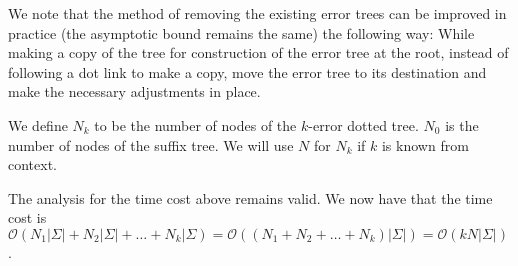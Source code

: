We note that the method of removing the existing error trees can be improved in practice (the asymptotic bound remains the same) the following way: While making a copy of the tree for construction of the error tree at the root, instead of following a dot link to make a copy, move the error tree to its destination and make the necessary adjustments in place.%

\begin{definition}
We define $N_k$ to be the number of nodes of the $k$-error dotted tree. $N_0$ is the number of nodes of the suffix tree. We will use $N$ for $N_k$ if $k$ is known from context.
\end{definition}

The analysis for the time cost above remains valid. We now have that the time cost is $\mathcal{O}(N_1|\Sigma|+N_2|\Sigma|+\dots+N_k|\Sigma)=\mathcal{O}((N_1+N_2+\dots+N_k)|\Sigma|)=\mathcal{O}(kN|\Sigma|)$.

